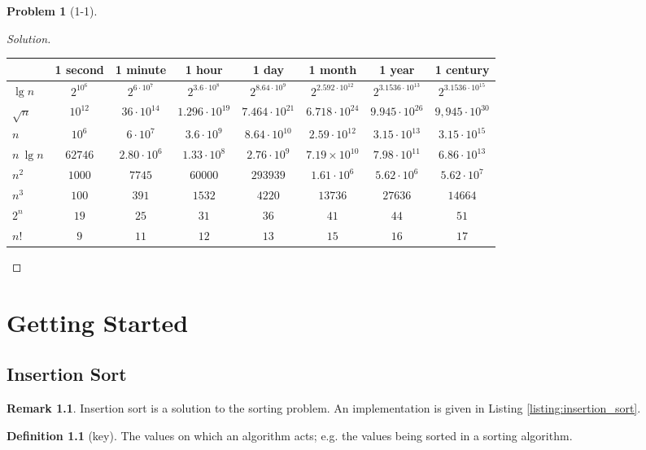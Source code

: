 \documentclass[oneside]{book}
\theoremstyle{definition}
\newtheorem{problem}{Problem}[section]
\newtheorem{definition}{Definition}[chapter]
\newtheorem{rem}{Remark}[chapter]
\theoremstyle{plain}
\begin{document}
\begin{spacing}{1.618}
\begin{problem}[1-1]
\begin{proof}[Solution]
		\begin{tabular}{l|c|c|c|c|c|c|c|}
			 & 1 second & 1 minute & 1 hour & 1 day & 1 month & 1 year & 1 century \\
			 \hline
			 $\lg{n}$ & $2^{10^6}$ & $2^{6\cdot 10^7}$ & $ 2^{3.6 \cdot 10^8}$ & $2^{8.64 \cdot 10^9}$ & $2^{2.592\cdot 10^{12}}$ & $2^{3.1536\cdot 10^{13}}$ & $2^{3.1536 \cdot 10^{15}}$ \\
			 \hline
			 $\sqrt{n}$ & $10^{12}$ & $36 \cdot 10^{14}$ & $1.296 \cdot 10^{19}$ & $7.464\cdot 10^{21}$ & $6.718\cdot 10^{24}$ & $9.945\cdot 10^{26}$ & $9,945\cdot 10^{30}$ \\
			 \hline 
			 $n$ & $10^6$ & $6 \cdot 10^7$ & $3.6\cdot 10^9$ & $8.64\cdot 10^{10}$ & $2.59\cdot 10^{12}$ & $3.15\cdot 10^{13}$ & $3.15\cdot 10^{15}$ \\
			 \hline
			 $n~\lg{n}$ & $62746$ & $2.80\cdot 10^6$ & $1.33\cdot 10^8$ & $2.76\cdot 10^9$ & $7.19\times 10^{10}$ & $7.98\cdot 10^{11}$ & $6.86\cdot 10^{13}$ \\
			 \hline
			 $n^2$ & $1000$ & $7745$ & $60000$ & $293939$ & $1.61\cdot 10^6$ & $5.62\cdot 10^6$ & $5.62\cdot 10^7$ \\
			\hline
			 $n^3$ & $100$ & $391$ & $ 1532$ & $4220$ & $13736$ & $27636$ & $14664$\\
			\hline
			 $2^n$ & $19$ & $25$ & $31$ & $36$ & $41$ & $ 44$ & $ 51$ \\
			\hline
			 $n!$ & $9$ & $11$ & $12$ & $13$ & $15$ & $16$ & $17$\\
			\hline
		\end{tabular}
	\end{proof}
\end{problem}

\chapter{Getting Started}
\section{Insertion Sort}

\begin{rem}
	Insertion sort is a solution to the sorting problem. An implementation is given in Listing \ref{listing:insertion_sort}.
\end{rem}

\begin{definition}[key]
	The values on which an algorithm acts; e.g. the values being sorted in a sorting algorithm. 
\end{definition}


\end{spacing}
\end{document}
